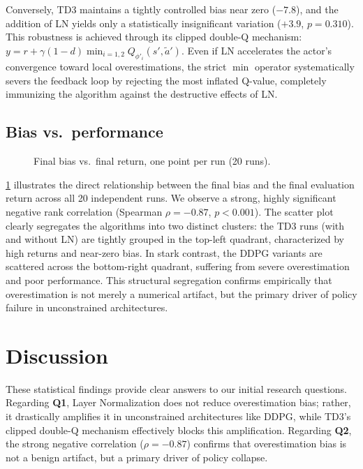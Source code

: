 \documentclass[10pt,a4paper]{article}
\begin{document}
Conversely, TD3 maintains a tightly controlled bias near zero ($-7.8$), and the addition of LN yields only a statistically insignificant variation ($+3.9$, $p = 0.310$). This robustness is achieved through its clipped double-Q mechanism: $y = r + \gamma (1-d) \min_{i=1,2} Q_{\phi'_i}(s', \tilde a')$. Even if LN accelerates the actor's convergence toward local overestimations, the strict $\min$ operator systematically severs the feedback loop by rejecting the most inflated Q-value, completely immunizing the algorithm against the destructive effects of LN.
\begin{table}[h]
  \centering
  \small
  \caption{Final values (mean over 5 seeds of the last 3 evaluations, 95\% bootstrap CI) and pairwise tests between configurations.}
  \label{tab:stats}
\end{table}

\subsection{Bias vs.\ performance}
\begin{figure}[h]
  \centering
  \caption{Final bias vs.\ final return, one point per run (20 runs).}
  \label{fig:scatter}
\end{figure}
\cref{fig:scatter} illustrates the direct relationship between the final bias and the final evaluation return across all 20 independent runs. We observe a strong, highly significant negative rank correlation (Spearman $\rho = -0.87$, $p < 0.001$). The scatter plot clearly segregates the algorithms into two distinct clusters: the TD3 runs (with and without LN) are tightly grouped in the top-left quadrant, characterized by high returns and near-zero bias. In stark contrast, the DDPG variants are scattered across the bottom-right quadrant, suffering from severe overestimation and poor performance. This structural segregation confirms empirically that overestimation is not merely a numerical artifact, but the primary driver of policy failure in unconstrained architectures.
\section{Discussion}
\label{sec:discussion}
These statistical findings provide clear answers to our initial research questions. Regarding \textbf{Q1}, Layer Normalization does not reduce overestimation bias; rather, it drastically amplifies it in unconstrained architectures like DDPG, while TD3's clipped double-Q mechanism effectively blocks this amplification. Regarding \textbf{Q2}, the strong negative correlation ($\rho = -0.87$) confirms that overestimation bias is not a benign artifact, but a primary driver of policy collapse. 
\end{document}
